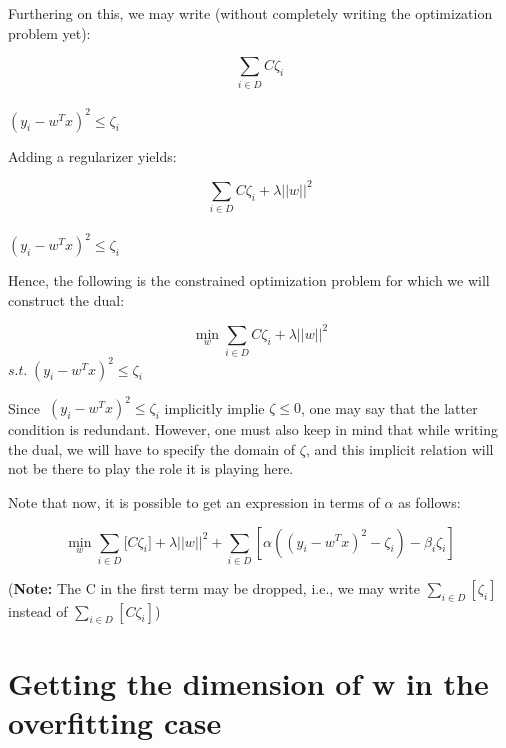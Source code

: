 \documentclass[11pt, twosides]{article}
\begin{document}
Furthering on this, we may write (without completely writing the optimization problem yet):
\begin{center}
    \vspace{-25pt}
    \[\sum_{i \in D}C\zeta_{i}\]
    \\\vspace{3pt}
   $(y_i - w^T x)^2 \le \zeta_{i}$
\end{center}
Adding a regularizer yields:
\begin{center}
    \vspace{-25pt}
    \[{\sum_{i \in D}C\zeta_{i}} + \lambda||w||^2\]
    \\\vspace{3pt}
   $(y_i - w^T x)^2 \le \zeta_{i}$
\end{center}
Hence, the following is the constrained optimization problem for which we will construct the dual:
\begin{center}
    \vspace{-25pt}
     \[{ \min_{w} \sum \limits_{i\in D} C\zeta_{i}} + \lambda||w||^2\]
   $s.t. \hspace{3pt}  (y_i - w^T x)^2 \le \zeta_{i}$
\end{center}

Since $\hspace{3pt}  (y_i - w^T x)^2 \le \zeta_{i}$ implicitly implie $\zeta \le 0$, one may say that the latter condition is redundant. However, one must also keep in mind that while writing the dual, we will have to specify the domain of $\zeta$, and this implicit relation will not be there to play the role it is playing here.

Note that now, it is possible to get an expression in terms of $\alpha$ as follows:

\begin{center}
    \vspace{-20pt}
     \[{ \min_{w} \sum \limits_{i\in D} [C\zeta_{i}}] + \lambda||w||^2 + \sum \limits_{i\in D} [\alpha ((y_i - w^T x)^2 - \zeta_{i}) - \beta_{i}\zeta_{i}]\]
\end{center}
\footnotesize{({\bf Note: }The C in the first term may be dropped, i.e., we may write $\sum \limits_{i\in D} [\zeta_{i}]$ instead of $\sum \limits_{i\in D} [C\zeta_{i}]$)}

\normalsize



\section{Getting the dimension of w in the overfitting case}
\end{document}
